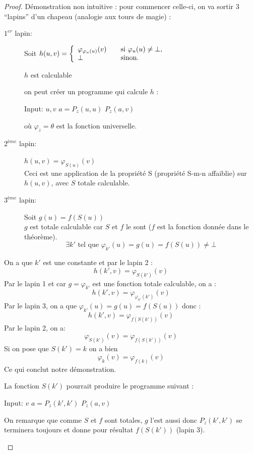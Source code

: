 \begin{proof}
Démonstration non intuitive : pour commencer celle-ci, on va sortir 3 ``lapins'' d'un chapeau (analogie aux tours de magie) :
\begin{description}

	\item[$1^{er}$ lapin:] Soit $ h(u,v) = \left\{
	\begin{array}{l l}
		\varphi_{\varphi_{u}(u)}(v) & \quad \text{si }\varphi_u(u)\neq \bot,\\
    	\bot & \quad \text{sinon}.
	\end{array} \right.$

		$h$ est calculable
		\begin{myrem}
			on peut créer un programme qui calcule $h$ :
            \begin{algorithmic}
              \STATE Input: $u,v$
              \STATE $a = P_z(u,u)$
              \STATE $P_z(a,v)$
            \end{algorithmic}
            où $\varphi_z = \theta$ est la fonction universelle.
		\end{myrem}

	\item[$2^{ème}$ lapin:] $h(u,v)=\varphi_{S(u)}(v)$\\
	Ceci est une application de la propriété S (propriété S-m-n affaiblie) sur $h(u,v)$, avec $S$ totale calculable.

	\item[$3^{ème}$ lapin:] Soit $g(u)=f(S(u))$\\
	 $g$ est totale calculable car $S$ et $f$ le sont ($f$
		est la fonction donnée dans le théorème).
		\[ \exists k' \text{ tel que } \varphi_{k'}(u) =g(u)=f(S(u)) \neq \bot \]
\end{description}
On a que $k'$ est une constante et par le lapin 2 :
\[h(k',v) = \varphi_{S(k')}(v)\]
Par le lapin 1 et car $g=\varphi_{k'}$ est une fonction totale calculable, on a :
\[h(k',v) = \varphi_{\varphi_{k'}(k')}(v)\]
Par le lapin 3, on a que $\varphi_{k'}(u) = g(u)=f(S(u))$ donc :
\[h(k',v) = \varphi_{f(S(k'))}(v)\]
Par le lapin 2, on a:
\[ \varphi_{S(k')}(v) =\varphi_{f(S(k'))}(v) \]
Si on pose que $S(k')=k$ on a bien
\[ \varphi_{k}(v) = \varphi_{f(k)}(v) \]
Ce qui conclut notre démonstration.
		\begin{myrem}
          La fonction $S(k')$ pourrait produire le programme suivant :
          \begin{algorithmic}
            \STATE Input: $v$
            \STATE $a = P_z(k',k')$
            \STATE $P_z(a,v)$
          \end{algorithmic}
          On remarque que comme $S$ et $f$ sont totales,
          $g$ l'est aussi donc $P_z(k',k')$ se terminera toujours et donne pour résultat $f(S(k'))$ (lapin 3).


\end{myrem}
\end{proof}
